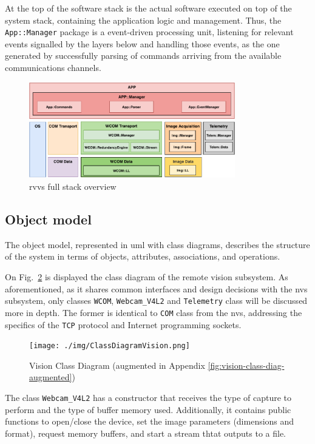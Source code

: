 At the top of the software stack is the actual software executed on top of the
system stack, containing the application logic and management. Thus, the
\texttt{App::Manager} package is a event-driven processing unit, listening for
relevant events signalled by the layers below and handling those events, as the
one generated by successfully parsing of commands arriving from the available
communications channels. 
\begin{figure}[!hbt]
\centering
    \includegraphics[width=0.8\textwidth]{./img/rvvs-full-stack.pdf}
  \caption{\acrshort{rvvs} full stack overview}%
\label{fig:rvvs-full-stack}
\end{figure}
%
\subsection{Object model}%
\label{sec:object-model-rvvs}
The object model, represented in \gls{uml} with class diagrams, describes the
structure of the system in terms of objects, attributes, associations, and
operations.

On Fig.~\ref{fig:vision-class-diag} is displayed the class diagram of the remote
vision subsystem. As aforementioned, as it shares common interfaces and design
decisions with the \gls{nvs} subsystem, only classes \texttt{WCOM},
\texttt{Webcam\_V4L2} and \texttt{Telemetry} class will be discussed more in
depth.  The former is identical to \texttt{COM} class from the \gls{nvs},
addressing the specifics of the \texttt{TCP} protocol and Internet programming
sockets.
%
\begin{figure}[!hbt]
\centering
    \texttt{[image: ./img/ClassDiagramVision.png]}
  \caption{Vision Class Diagram (augmented in Appendix \ref{fig:vision-class-diag-augmented})}%
\label{fig:vision-class-diag}
\end{figure}
%

The class \texttt{Webcam\_V4L2} has a constructor that receives the type of
capture to perform and the type of buffer memory used. Additionally, it contains
public functions to open/close the device, set the image parameters (dimensions
and format), request memory buffers, and start a stream thtat outputs to a file.

